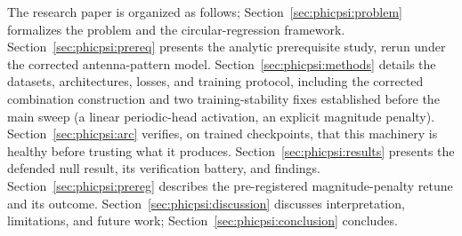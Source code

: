 The research paper is organized as follows;
Section~\ref{sec:phicpsi:problem} formalizes the problem and the circular-regression framework.
Section~\ref{sec:phicpsi:prereq} presents the analytic prerequisite study, rerun under the corrected antenna-pattern model.
Section~\ref{sec:phicpsi:methods} details the datasets, architectures, losses, and training protocol, including the corrected combination construction and two training-stability fixes established before the main sweep (a linear periodic-head activation, an explicit magnitude penalty).
Section~\ref{sec:phicpsi:arc} verifies, on trained checkpoints, that this machinery is healthy before trusting what it produces.
Section~\ref{sec:phicpsi:results} presents the defended null result, its verification battery, and findings.
Section~\ref{sec:phicpsi:prereg} describes the pre-registered magnitude-penalty retune and its outcome.
Section~\ref{sec:phicpsi:discussion} discusses interpretation, limitations, and future work; Section~\ref{sec:phicpsi:conclusion} concludes.
